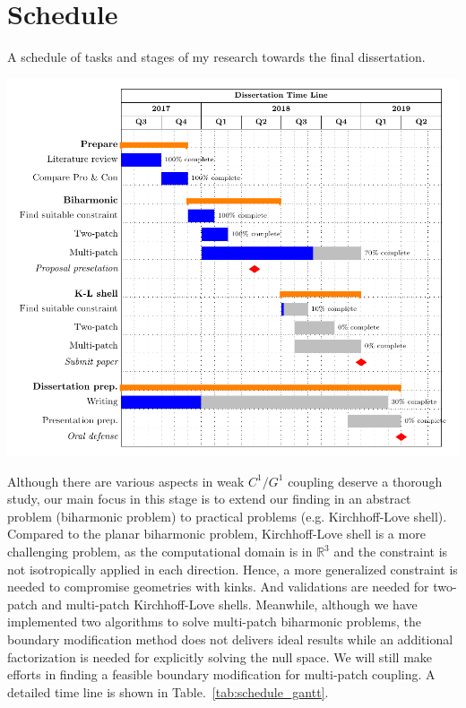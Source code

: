 \documentclass[preprint,12pt]{elsarticle}
\theoremstyle{remark}
\begin{document}
\section{Schedule}
\begin{table}[hbt]
    \caption{A schedule of tasks and stages of my research towards the final dissertation.}
    \hspace*{-1.5in}
	\centering
    \includegraphics[width=1.5\linewidth]{schedule}\label{tab:schedule_gantt}
\end{table}
Although there are various aspects in weak $C^1/G^1$ coupling deserve a thorough study, our main focus in this stage is to extend our finding in an abstract problem (biharmonic problem) to practical problems (e.g. Kirchhoff-Love shell). Compared to the planar biharmonic problem, Kirchhoff-Love shell is a more challenging problem, as the computational domain is in $\mathbb{R}^3$ and the constraint is not isotropically applied in each direction. Hence, a more generalized constraint is needed to compromise geometries with kinks. And validations are needed for two-patch and multi-patch Kirchhoff-Love shells. Meanwhile, although we have implemented two algorithms to solve multi-patch biharmonic problems, the boundary modification method does not delivers ideal results while an additional factorization is needed for explicitly solving the null space. We will still make efforts in finding a feasible boundary modification for multi-patch coupling. A detailed time line is shown in Table.~\ref{tab:schedule_gantt}.
\end{document}
